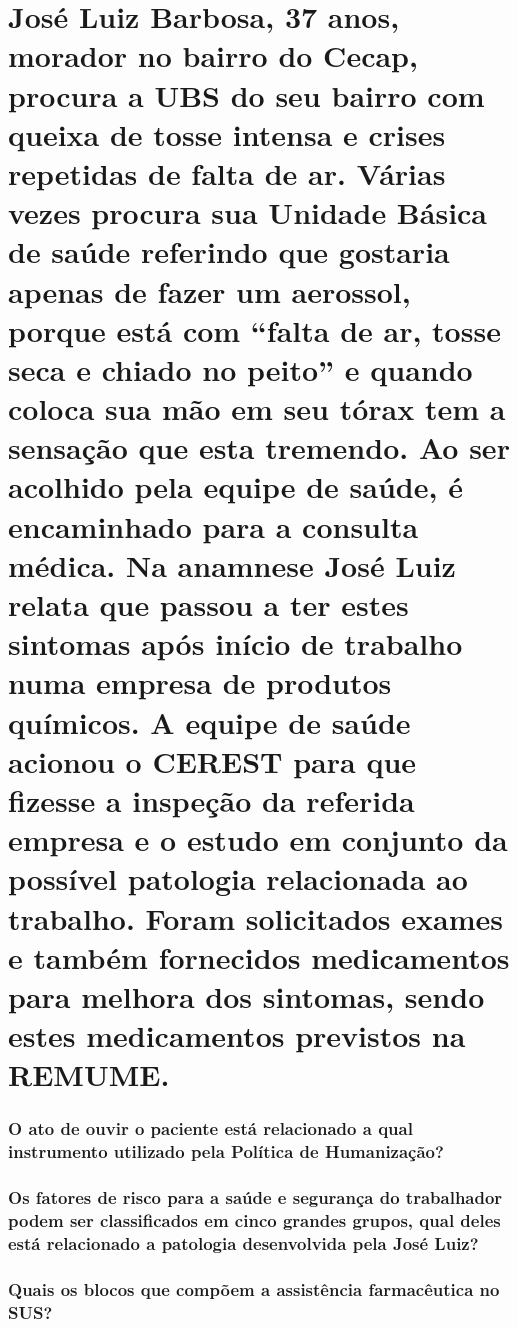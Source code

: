 \documentclass[11pt,notitlepage]{article}
\title{\vspace{-5ex}}
\date{\vspace{-5ex}}
\author{}
\begin{document}

\maketitle %

\part{José Luiz Barbosa, 37 anos, morador no bairro do Cecap, procura a UBS do seu bairro com queixa de tosse intensa e crises repetidas de falta de ar. Várias vezes procura sua Unidade Básica de saúde  referindo que gostaria apenas de fazer um aerossol, porque está com “falta de ar, tosse seca e chiado no peito” e quando coloca sua mão em seu tórax tem a sensação que esta tremendo. Ao ser acolhido pela equipe de saúde, é encaminhado para a consulta médica. Na anamnese José Luiz relata que passou a ter estes sintomas após início de trabalho numa empresa de produtos químicos. A equipe de saúde acionou o CEREST para que fizesse a inspeção da referida empresa e o estudo em conjunto da possível patologia relacionada ao trabalho. Foram solicitados exames e também fornecidos medicamentos para melhora dos sintomas, sendo estes medicamentos previstos na REMUME.}
\vspace{0.5cm}

\section{O ato de ouvir o paciente está relacionado a qual instrumento utilizado pela Política de Humanização?}
\noindent\makebox[\linewidth]{\rule{\textwidth}{0.5pt}}
\noindent\makebox[\linewidth]{\rule{\textwidth}{0.5pt}}
\vspace{0.5cm}

\section{Os fatores de risco para a saúde e segurança do trabalhador podem ser classificados em cinco grandes grupos, qual deles está relacionado a patologia desenvolvida pela José Luiz?}
\noindent\makebox[\linewidth]{\rule{\textwidth}{0.5pt}}
\noindent\makebox[\linewidth]{\rule{\textwidth}{0.5pt}}
\vspace{0.5cm}

\section{Quais os blocos que compõem a assistência farmacêutica no SUS?}
\noindent\makebox[\linewidth]{\rule{\textwidth}{0.5pt}}
\noindent\makebox[\linewidth]{\rule{\textwidth}{0.5pt}}
\noindent\makebox[\linewidth]{\rule{\textwidth}{0.5pt}}
\vspace{0.5cm}
\end{document}
